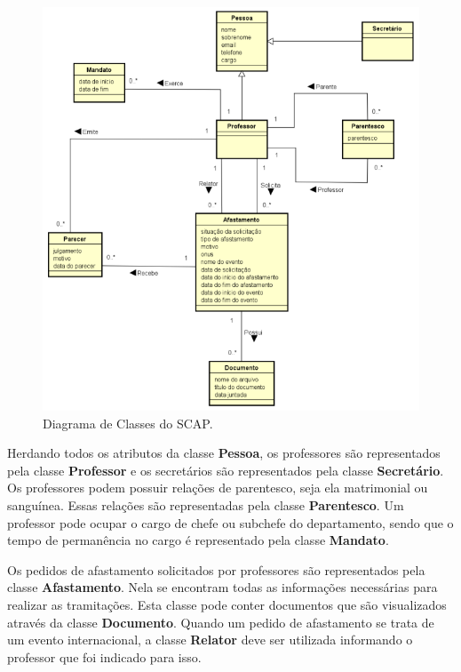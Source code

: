 \begin{figure}[h]
	\centering
	\includegraphics[scale=0.7]{figuras/fig-requisitos-diagrama-classes} 
	\caption{Diagrama de Classes do SCAP.}
	\label{fig-requisitos-diagrama-classes}
\end{figure}

Herdando todos os atributos da classe \textbf{Pessoa}, os professores são representados pela classe \textbf{Professor} e os secretários são representados pela classe \textbf{Secretário}. Os professores podem possuir relações de parentesco, seja ela matrimonial ou sanguínea. Essas relações são representadas pela classe \textbf{Parentesco}. Um professor pode ocupar o cargo de chefe ou subchefe do departamento, sendo que o tempo de permanência no cargo é representado pela classe \textbf{Mandato}.

Os pedidos de afastamento solicitados por professores são representados pela classe \textbf{Afastamento}. Nela se encontram todas as informações necessárias para realizar as tramitações. Esta classe pode conter documentos que são visualizados através da classe \textbf{Documento}. Quando um pedido de afastamento se trata de um evento internacional, a classe \textbf{Relator} deve ser utilizada informando o professor que foi indicado para isso.

